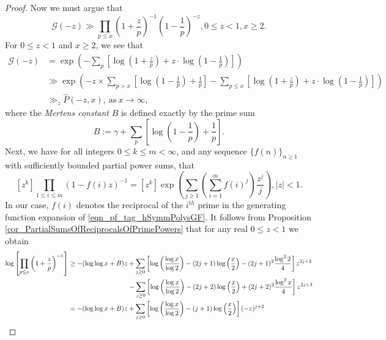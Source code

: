 \documentclass[11pt,reqno,a4letter]{article}
\numberwithin{figure}{section}
\numberwithin{table}{section}
\theoremstyle{plain}
\numberwithin{theorem}{section}
\theoremstyle{definition}
\begin{document}
\begin{proof}
Now we must argue that 
\[
\mathcal{G}(-z) \gg \prod_{p \leq x} \left(1 + \frac{z}{p}\right)^{-1} 
     \left(1 - \frac{1}{p}\right)^{-z}, 0 \leq z < 1, x \geq 2. 
\]
For $0 \leq z < 1$ and $x \geq 2$, we see that 
\begin{align*} 
\mathcal{G}(-z) & = \exp\left(-\sum_p \left[\log\left(1 + \frac{z}{p}\right) + 
     z \cdot \log\left(1 - \frac{1}{p}\right)\right]\right) \\ 
     & \gg 
     \exp\left(-z \times \sum_{p > x} \left[
     \log\left(1 - \frac{1}{p}\right) + \frac{1}{p}\right] - 
     \sum_{p \leq x} \left[\log\left(1 + \frac{z}{p}\right) + 
     z \cdot \log\left(1 - \frac{1}{p}\right)\right]\right) \\ 
     & \gg_z \widehat{P}(-z, x), \mathrm{\ as\ } x \rightarrow \infty, 
\end{align*} 
where the \emph{Mertens constant} $B$ is defined exactly by the prime sum 
\cite[\S 22.8]{HARDYWRIGHT} 
\[
B := \gamma + \sum_p \left[\log\left(1-\frac{1}{p}\right) + \frac{1}{p}\right]. 
\]
Next, we have for all integers $0 \leq k \leq m < \infty$, and any sequence 
$\{f(n)\}_{n \geq 1}$ with sufficiently bounded partial power sums, that 
\cite[\S 2]{MACDONALD-SYMFUNCS} 
\begin{equation} 
\label{eqn_pf_tag_hSymmPolysGF} 
[z^k] \prod_{1 \leq i \leq m} (1-f(i) z)^{-1} = [z^k] \exp\left(\sum_{j \geq 1} 
     \left(\sum_{i=1}^m f(i)^j\right) \frac{z^j}{j}\right), |z| < 1. 
\end{equation} 
In our case, $f(i)$ denotes the reciprocal of the 
$i^{th}$ prime in the generating function expansion of 
\eqref{eqn_pf_tag_hSymmPolysGF}. 
It follows from Proposition \ref{cor_PartialSumsOfReciprocalsOfPrimePowers} that 
for any real $0 \leq z < 1$ we obtain 
\begin{align} 
\notag 
\log\left[\prod_{p \leq x} \left(1+\frac{z}{p}\right)^{-1}\right] & \geq -(\log\log x + B) z + 
     \sum_{j \geq 0} \left[\log\left(\frac{\log x}{\log 2}\right) - 
     (2j+1) \log\left(\frac{x}{2}\right) - (2j+1)^2 \frac{\log^2 2}{4}\right] z^{2j+2} \\ 
\notag 
     & \phantom{\geq -(\log\log x + B) z\ } - 
     \sum_{j \geq 0} \left[\log\left(\frac{\log x}{\log 2}\right) - 
     (2j+2) \log\left(\frac{x}{2}\right) + (2j+2)^2 \frac{\log^2 x}{4}\right] z^{2j+3} \\ 
\notag 
     & = -(\log\log x + B) z + \sum_{j \geq 0} \left[ 
     \log\left(\frac{\log x}{\log 2}\right) - 
     (j+1) \log\left(\frac{x}{2}\right)\right] (-z)^{j+2} \\ 

\end{align}
\end{proof}
\end{document}
